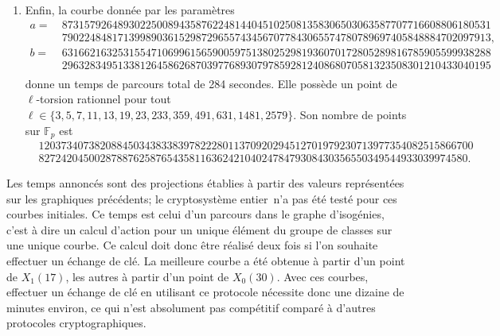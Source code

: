 \documentclass[11pt,a4paper]{article}
\newcommand{\F}{\mathbb{F}}
\renewcommand{\v}{\vspace{5mm}}
\theoremstyle{definition}
\begin{document}
\begin{enumerate}
\item Enfin, la courbe donnée par les paramètres
$$\begin{aligned}
a =\ & 87315792648930225008943587622481440451025081358306503063587707716608806180531 \\
& 79022484817139989036152987296557434567077843065574780789697405848884702097913,\\
b =\ & 63166216325315547106996156590059751380252981936070172805289816785905599938288 \\
& 29632834951338126458626870397768930797859281240868070581323508301210433040195\\
\end{aligned}$$
donne un temps de parcours total de 284 secondes. Elle possède un point de $\ell$-torsion rationnel pour tout $\ell\in\{3, 5, 7, 11, 13, 19, 23, 233, 359, 491, 631, 1481, 2579\}$. Son nombre de points sur $\F_p$ est
$$\begin{aligned}
&120373407382088450343833839782228011370920294512701979230713977354082515866700 \\
&82724204500287887625876543581163624210402478479308430356550349544933039974580.
\end{aligned}$$


\end{enumerate}


\v
Les temps annoncés sont des projections établies à partir des valeurs représentées sur les graphiques précédents; le cryptosystème \og entier\fg\ n'a pas été testé pour ces courbes initiales. Ce temps est celui d'un parcours dans le graphe d'isogénies, c'est à dire un calcul d'action pour un unique élément du groupe de classes sur une unique courbe. Ce calcul doit donc être réalisé deux fois si l'on souhaite effectuer un échange de clé. La meilleure courbe a été obtenue à partir d'un point de $X_1(17)$, les autres à partir d'un point de $X_0(30)$. Avec ces courbes, effectuer un échange de clé en utilisant ce protocole nécessite donc une dizaine de minutes environ, ce qui n'est absolument pas compétitif comparé à d'autres protocoles cryptographiques.



\newpage




\end{document}
